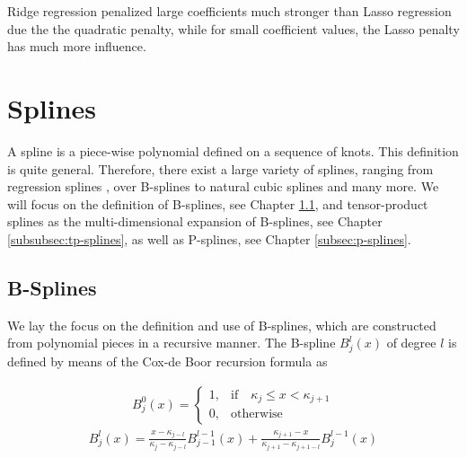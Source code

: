 \documentclass[10pt,a4paper]{report}
\begin{document}
Ridge regression penalized large coefficients much stronger than Lasso regression due the the quadratic penalty, while for small coefficient values, the Lasso penalty has much more influence. \cite{tibshirani1996lasso}

\section{Splines} \label{sec:Splines}
	
A spline is a piece-wise polynomial defined on a sequence of knots. This definition is quite general. Therefore, there exist a large variety of splines, ranging from regression splines \cite{eubank1990regressionsplines}, over B-splines \cite{deBoor1978practicalGuideToSplines} to natural cubic splines and many more. We will focus on the definition of B-splines, see Chapter \ref{subsec:b-splines}, and tensor-product splines as the multi-dimensional expansion of B-splines, see Chapter \ref{subsubsec:tp-splines}, as well as P-splines, see Chapter \ref{subsec:p-splines}. \cite{deBoor1978practicalGuideToSplines} \cite{eilers1996flexible}
\subsection{B-Splines} \label{subsec:b-splines}


We lay the focus on the definition and use of B-splines, which are constructed from polynomial pieces in a recursive manner. The B-spline $B_j^l(x)$ of degree $l$ is defined by means of the Cox-de Boor recursion formula as

\begin{align} \label{eq:Bspline_recDef1}
	B_j^0(x) = \begin{cases} 1, & \text{if} \quad \kappa_j \le x < \kappa_{j+1} \\ 
					 		 0, & \text{otherwise} 
	\end{cases}
\end{align}
\begin{align} \label{eq:Bspline_recDef2}
	B_j^l(x) = \frac{x - \kappa_{j-l}}{\kappa_{j} - \kappa_{j-l}} B_{j-1}^{l-1}(x) + \frac{\kappa_{j+1} - x}{\kappa_{j+1} - \kappa_{j+1-l}} B_{j}^{l-1}(x)
\end{align}
\end{document}
